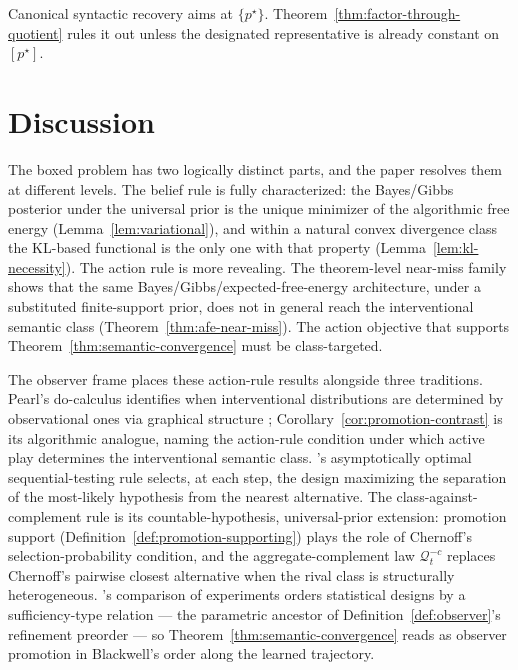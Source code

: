 \documentclass[11pt]{article}
\theoremstyle{definition}
\theoremstyle{remark}
\newcommand{\Qcal}{\mathcal{Q}}
\begin{document}
Canonical syntactic recovery aims at $\{p^\star\}$. Theorem~\ref{thm:factor-through-quotient} rules it out unless the designated representative is already constant on $[p^\star]$.

\section{Discussion}
\label{sec:discussion}

The boxed problem has two logically distinct parts, and the paper resolves them at different levels. The belief rule is fully characterized: the Bayes/Gibbs posterior under the universal prior is the unique minimizer of the algorithmic free energy (Lemma~\ref{lem:variational}), and within a natural convex divergence class the KL-based functional is the only one with that property (Lemma~\ref{lem:kl-necessity}). The action rule is more revealing. The theorem-level near-miss family shows that the same Bayes/Gibbs/expected-free-energy architecture, under a substituted finite-support prior, does not in general reach the interventional semantic class (Theorem~\ref{thm:afe-near-miss}). The action objective that supports Theorem~\ref{thm:semantic-convergence} must be class-targeted.

The observer frame places these action-rule results alongside three traditions. Pearl's do-calculus identifies when interventional distributions are determined by observational ones via graphical structure \citep{Pearl2009}; Corollary~\ref{cor:promotion-contrast} is its algorithmic analogue, naming the action-rule condition under which active play determines the interventional semantic class. \citet{Chernoff1959}'s asymptotically optimal sequential-testing rule selects, at each step, the design maximizing the separation of the most-likely hypothesis from the nearest alternative. The class-against-complement rule is its countable-hypothesis, universal-prior extension: promotion support (Definition~\ref{def:promotion-supporting}) plays the role of Chernoff's selection-probability condition, and the aggregate-complement law $\Qcal_t^{-c}$ replaces Chernoff's pairwise closest alternative when the rival class is structurally heterogeneous. \citet{Blackwell1953}'s comparison of experiments orders statistical designs by a sufficiency-type relation --- the parametric ancestor of Definition~\ref{def:observer}'s refinement preorder --- so Theorem~\ref{thm:semantic-convergence} reads as observer promotion in Blackwell's order along the learned trajectory.
\end{document}
